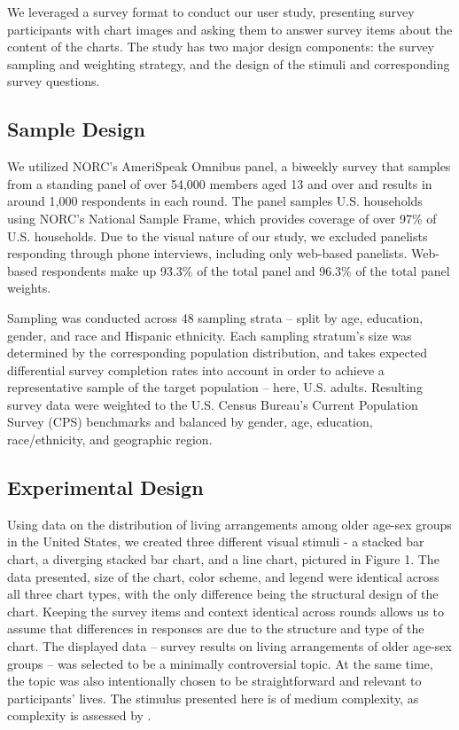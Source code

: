 \documentclass{IEEEcsmag}
\begin{document}
We leveraged a survey format to conduct our user study, presenting survey participants with chart images and asking them to answer survey items about the content of the charts. The study has two major design components: the survey sampling and weighting strategy, and the design of the stimuli and corresponding survey questions.

\subsection{Sample Design}\label{sample-design}

We utilized NORC's AmeriSpeak Omnibus panel, a biweekly survey that samples from a standing panel of over 54,000 members aged 13 and over  and results in around 1,000 respondents in each round. The panel samples U.S. households using NORC's National Sample Frame, which provides coverage of over 97\% of U.S. households. Due to the visual nature of our study, we excluded panelists responding through phone interviews, including only web-based panelists. Web-based respondents make up 93.3\% of the total panel and 96.3\% of the total panel weights.

Sampling was conducted across 48 sampling strata -- split by age, education, gender, and race and Hispanic ethnicity. Each sampling stratum's size was determined by the corresponding population distribution, and takes expected differential survey completion rates into account in order to achieve a representative sample of the target population -- here, U.S. adults. Resulting survey data were weighted to the U.S. Census Bureau's Current Population Survey (CPS) benchmarks and balanced by gender, age, education, race/ethnicity, and geographic region.

\subsection{Experimental Design}\label{experimental-design}

Using data on the distribution of living arrangements among older age-sex groups in the United States, we created three different visual stimuli - a stacked bar chart, a diverging stacked bar chart, and a line chart, pictured in Figure 1. The data presented, size of the chart, color scheme, and legend were identical across all three chart types, with the only difference being the structural design of the chart. Keeping the survey items and context identical across rounds allows us to assume that differences in responses are due to the structure and type of the chart. The displayed data -- survey results on living arrangements of older age-sex groups -- was selected to be a minimally controversial topic. At the same time, the topic was also intentionally chosen to be straightforward and relevant to participants' lives. The stimulus presented here is of medium complexity, as complexity is assessed by .
\end{document}
